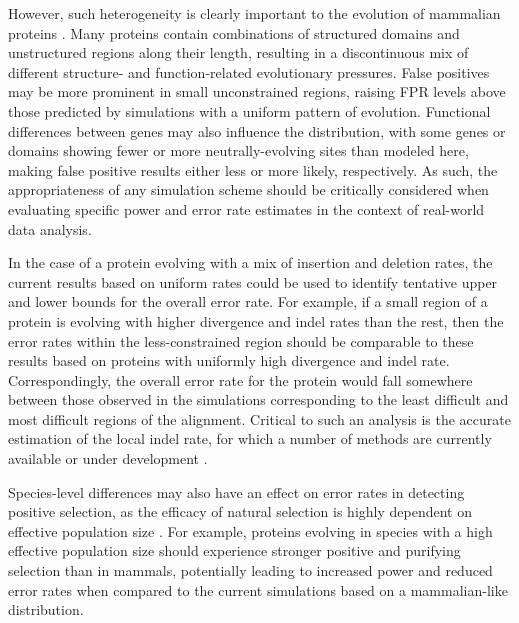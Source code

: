 However, such heterogeneity is clearly important to the evolution of
mammalian proteins \citep{Fay2003}. Many proteins contain combinations
of structured domains and unstructured regions along their length,
resulting in a discontinuous mix of different structure- and
function-related evolutionary pressures. False positives may be more
prominent in small unconstrained regions, raising FPR levels above
those predicted by simulations with a uniform pattern of
evolution. Functional differences between genes may also influence the
\omg distribution, with some genes or domains showing fewer or more
neutrally-evolving sites than modeled here, making false positive
results either less or more likely, respectively. As such, the
appropriateness of any simulation scheme should be critically
considered when evaluating specific power and error rate estimates in
the context of real-world data analysis.

In the case of a protein evolving with a mix of insertion and deletion
rates, the current results based on uniform rates could be used to identify
tentative upper and lower bounds for the overall error rate. For
example, if a small region of a protein is evolving with higher
divergence and indel rates than the rest, then the error rates within
the less-constrained region should be comparable to these results based
on proteins with uniformly high divergence and indel
rate. Correspondingly, the overall error rate for the protein would
fall somewhere between those observed in the simulations 
corresponding to the least difficult and most difficult regions of the
alignment. Critical to such an analysis is the accurate estimation of
the local indel rate, for which a number of methods are currently
available or under development
\citep{Holmes2005,Cartwright2009Problems}.

Species-level differences may also have an effect on error rates in
detecting positive selection, as the efficacy of natural selection is
highly dependent on effective population size
\citep{Ellegren2009}. For example, proteins evolving in \Dr
species with a high effective population size should experience
stronger positive and purifying selection than in mammals, potentially
leading to increased power and reduced error rates when compared to
the current simulations based on a mammalian-like \omg distribution.

